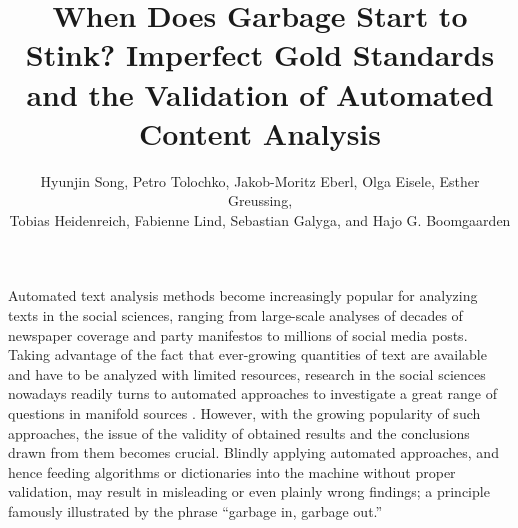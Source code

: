 \documentclass[man, 12pt, a4paper, nolmodern, noextraspace]{apa6}
\title{When Does Garbage Start to Stink? Imperfect Gold Standards and the Validation of Automated Content Analysis}
\author{\addvspace{.25in} Hyunjin Song, Petro Tolochko, Jakob-Moritz Eberl, Olga Eisele, Esther Greussing, \\
        Tobias Heidenreich, Fabienne Lind, Sebastian Galyga, and Hajo G. Boomgaarden}
\affiliation{Department of Communication, University of Vienna, Austria}
\begin{document}
    
\setcounter{page}{0}
\maketitle

    Automated text analysis methods become increasingly popular for analyzing texts in the social sciences, ranging from large-scale analyses of decades of newspaper coverage and party manifestos to millions of social media posts. Taking advantage of the fact that ever-growing quantities of text are available and have to be analyzed with limited resources, research in the social sciences nowadays readily turns to automated approaches to investigate a great range of questions in manifold sources \parencite{Boumans_Trilling_2016, grimmer2013text}. However, with the growing popularity of such approaches, the issue of the validity of obtained results and the conclusions drawn from them becomes crucial. Blindly applying automated approaches, and hence feeding algorithms or dictionaries into the machine without proper validation, may result in misleading or even plainly wrong findings; a principle famously illustrated by the phrase \enquote{garbage in, garbage out.}
    
\end{document}
